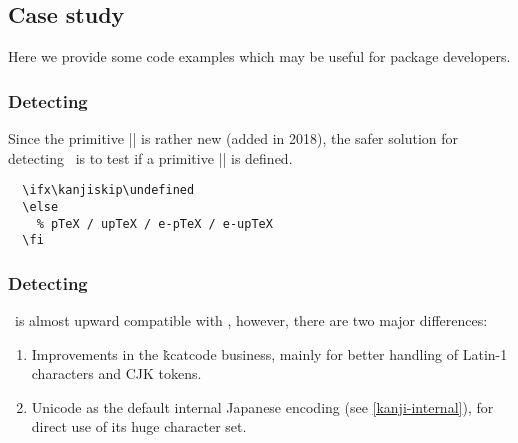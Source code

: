 \documentclass[a4paper,11pt,dvipdfmx]{article}
\def\code#1{\texttt{#1}}
\begin{document}

\subsection{Case study}

Here we provide some code examples
which may be useful for package developers.

\subsubsection{Detecting \pTeX}

Since the primitive |\ptexversion| is rather new (added in 2018),
the safer solution for detecting \pTeX\ is
to test if a primitive |\kanjiskip| is defined.
\begin{verbatim}
  \ifx\kanjiskip\undefined
  \else
    % pTeX / upTeX / e-pTeX / e-upTeX
  \fi
\end{verbatim}

\subsubsection{Detecting \upTeX}\label{detecting-uptex}

\upTeX\ is almost upward compatible with \pTeX, however,
there are two major differences:
\begin{enumerate}
  \item Improvements in the \.{kcatcode} business,
    mainly for better handling of Latin-1 characters and CJK tokens.
  \item Unicode as the default internal Japanese encoding
    (see \ref{kanji-internal}),
    for direct use of its huge character set.
\end{enumerate}
\end{document}
